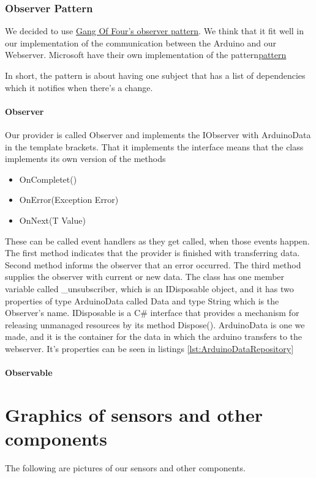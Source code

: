 \documentclass[a4paper,12pt,twoside,openright,titlepage]{book}
\begin{document}
\subsection{Observer Pattern}
We decided to use \href{https://en.wikipedia.org/wiki/Observer_pattern}{Gang Of Four's observer pattern}. We think that it fit well in our implementation of the communication between the Arduino and our Webserver. Microsoft have their own implementation of the pattern\href{https://docs.microsoft.com/en-us/dotnet/standard/events/observer-design-pattern}{pattern}
 
In short, the pattern is about having one subject that has a list of dependencies which it notifies when there's a change.

\subsubsection{Observer}
Our provider is called Observer and implements the IObserver with ArduinoData in the template brackets. That it implements the interface means that the class implements its own version of the methods
\begin{itemize}
\item OnCompletet()
\item OnError(Exception Error)
\item OnNext(T Value)
\end{itemize}

These can be called event handlers as they get called, when those events happen. The first method indicates that the provider is finished with transferring data. Second method informs the observer that an error occurred. The third method supplies the observer with current or new data. 
The class has one member variable called \_unsubscriber, which is an IDisposable object, and it has two properties of type ArduinoData called Data and type String which is the Observer's name. IDisposable is a C\# interface that provides a mechanism for releasing unmanaged resources by its method Dispose(). ArduinoData is one we made, and it is the container for the data in which the arduino transfers to the webserver. It's properties can be seen in listings \ref{lst:ArduinoDataRepository}

\subsubsection{Observable}

\appendix

\chapter{Graphics of sensors and other components}
The following are pictures of our sensors and other components.
\end{document}
